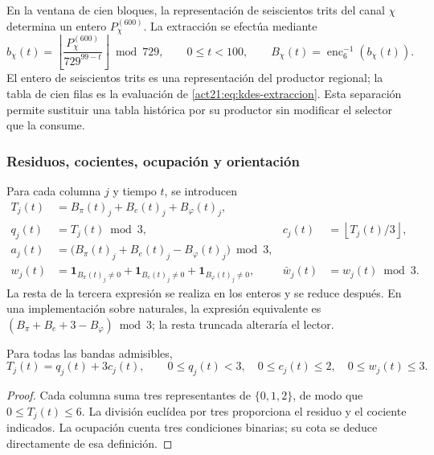 En la ventana de cien bloques, la representación de seiscientos trits del
canal $\chi$ determina un entero $P_\chi^{(600)}$. La extracción se efectúa
mediante
\begin{equation}
 b_\chi(t)=
 \left\lfloor\frac{P_\chi^{(600)}}{729^{99-t}}\right\rfloor\bmod729,
 \qquad 0\leq t<100,
 \qquad B_\chi(t)=\operatorname{enc}_6^{-1}(b_\chi(t)).
 \label{act21:eq:kdes-extraccion}
\end{equation}
El entero de seiscientos trits es una representación del productor regional;
la tabla de cien filas es la evaluación de
\eqref{act21:eq:kdes-extraccion}. Esta separación permite sustituir una tabla
histórica por su productor sin modificar el selector que la consume.

\subsubsection{Residuos, cocientes, ocupación y orientación}

Para cada columna $j$ y tiempo $t$, se introducen
\begin{align}
 T_j(t)&=B_\pi(t)_j+B_e(t)_j+B_\varphi(t)_j,\\
 q_j(t)&=T_j(t)\bmod3,
 &c_j(t)&=\left\lfloor T_j(t)/3\right\rfloor,\\
 a_j(t)&=\bigl(B_\pi(t)_j+B_e(t)_j-B_\varphi(t)_j\bigr)\bmod3,\\
 w_j(t)&=\mathbf1_{B_\pi(t)_j\ne0}
       +\mathbf1_{B_e(t)_j\ne0}
       +\mathbf1_{B_\varphi(t)_j\ne0},
 &\bar w_j(t)&=w_j(t)\bmod3.
 \label{act21:eq:kdes-firmas}
\end{align}
La resta de la tercera expresión se realiza en los enteros y se reduce
después. En una implementación sobre naturales, la expresión equivalente
es $(B_\pi+B_e+3-B_\varphi)\bmod3$; la resta truncada alteraría el lector.

\begin{proposition}
Para todas las bandas admisibles,
\[
 T_j(t)=q_j(t)+3c_j(t),\qquad
 0\leq q_j(t)<3,\quad 0\leq c_j(t)\leq2,
 \quad0\leq w_j(t)\leq3.
\]
\end{proposition}
\begin{proof}
Cada columna suma tres representantes de $\{0,1,2\}$, de modo que
$0\leq T_j(t)\leq6$. La división euclídea por tres proporciona el residuo
y el cociente indicados. La ocupación cuenta tres condiciones binarias;
su cota se deduce directamente de esa definición.
\end{proof}

